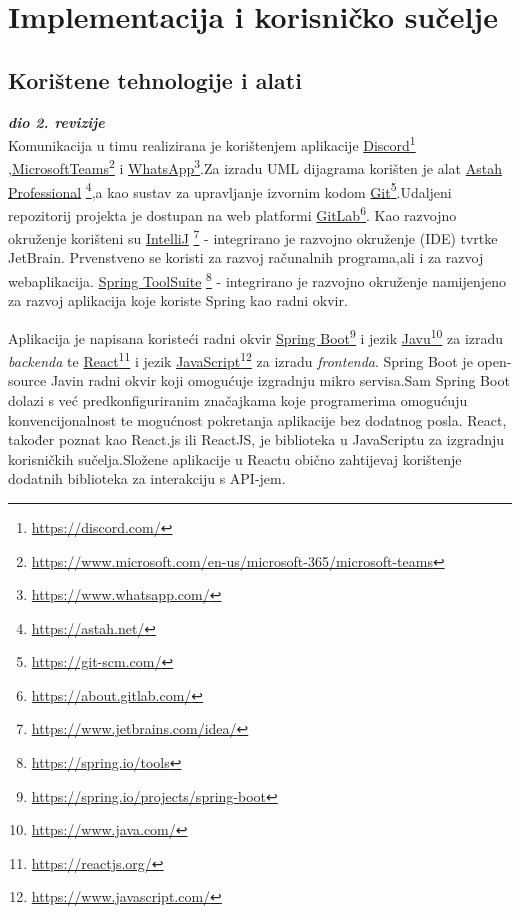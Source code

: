 \chapter{Implementacija i korisničko sučelje}
		
		\section{Korištene tehnologije i alati}
		
			\textbf{\textit{dio 2. revizije}}\\
			
            Komunikacija u timu realizirana je korištenjem aplikacije \underline{Discord}\footnote{\url{https://discord.com/}}  ,\underline{MicrosoftTeams}\footnote{\url{https://www.microsoft.com/en-us/microsoft-365/microsoft-teams}} i \underline{WhatsApp}\footnote{\url{https://www.whatsapp.com/}}.Za izradu UML dijagrama korišten je alat \underline{Astah Professional} \footnote{\url{https://astah.net/}},a kao sustav za upravljanje izvornim kodom \underline{Git}\footnote{\url{https://git-scm.com/}}.Udaljeni repozitorij projekta je dostupan na web platformi \underline{GitLab}\footnote{\url{https://about.gitlab.com/}}.
            Kao razvojno okruženje korišteni su \underline{IntelliJ}
            \footnote{\url{https://www.jetbrains.com/idea/}} - integrirano je razvojno okruženje (IDE) tvrtke JetBrain. Prvenstveno se koristi za razvoj računalnih programa,ali i za razvoj webaplikacija.
            \underline{Spring ToolSuite}
            \footnote{\url{https://spring.io/tools}} - integrirano je razvojno okruženje namijenjeno za razvoj aplikacija koje koriste Spring kao radni okvir.
            
            Aplikacija je napisana koristeći  radni
            okvir \underline{Spring Boot}\footnote{\url{https://spring.io/projects/spring-boot}} i jezik \underline{Javu}\footnote{\url{https://www.java.com/}} za
            izradu \emph{backenda} te \underline{React}\footnote{\url{https://reactjs.org/}} i jezik \underline{JavaScript}\footnote{\url{https://www.javascript.com/}} za izradu \emph{frontenda}.
            Spring Boot je open-source Javin radni okvir koji omogućuje izgradnju mikro servisa.Sam Spring Boot dolazi s već predkonfiguriranim značajkama koje programerima omogućuju konvencijonalnost te mogućnost pokretanja aplikacije bez dodatnog posla. 
            React, također poznat kao React.js ili ReactJS, je biblioteka u JavaScriptu za izgradnju korisničkih
            sučelja.Složene aplikacije u Reactu obično zahtijevaj korištenje dodatnih biblioteka za interakciju s API-jem.
            
